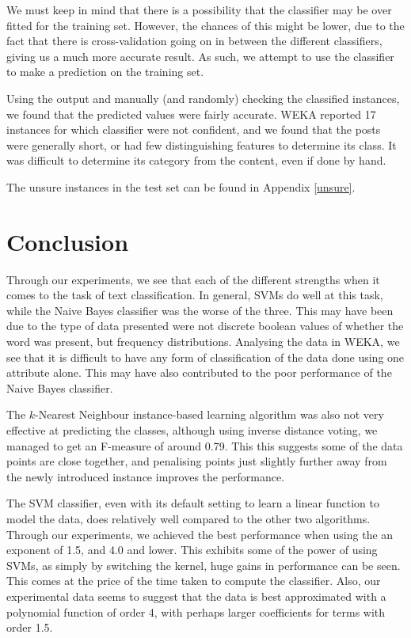 \documentclass[12pt]{article}
\begin{document}
We must keep in mind that there is a possibility that the classifier may be over fitted for the training set. However, the chances of this might be lower, due to the fact that there is cross-validation going on in between the different classifiers, giving us a much more accurate result. As such, we attempt to use the classifier to make a prediction on the training set. 

Using the output and manually (and randomly) checking the classified instances, we found that the predicted values were fairly accurate. WEKA reported 17 instances for which classifier were not confident, and we found that the posts were generally short, or had few distinguishing features to determine its class. It was difficult to determine its category from the content, even if done by hand. 

The unsure instances in the test set can be found in Appendix \ref{unsure}.

\section{Conclusion}
Through our experiments, we see that each of the different strengths when it comes to the task of text classification. In general, SVMs do well at this task, while the Naive Bayes classifier was the worse of the three. This may have been due to the type of data presented were not discrete boolean values of whether the word was present, but frequency distributions. Analysing the data in WEKA, we see that it is difficult to have any form of classification of the data done using one attribute alone. This may have also contributed to the poor performance of the Naive Bayes classifier.

The $k$-Nearest Neighbour instance-based learning algorithm was also not very effective at predicting the classes, although using inverse distance voting, we managed to get an F-measure of around 0.79. This this suggests some of the data points are close together, and penalising points just slightly further away from the newly introduced instance improves the performance.

The SVM classifier, even with its default setting to learn a linear function to model the data, does relatively well compared to the other two algorithms. Through our experiments, we achieved the best performance when using the an exponent of 1.5, and 4.0 and lower. This exhibits some of the power of using SVMs, as simply by switching the kernel, huge gains in performance can be seen. This comes at the price of the time taken to compute the classifier. Also, our experimental data seems to suggest that the data is best approximated with a polynomial function of order 4, with perhaps larger coefficients for terms with order 1.5.
\end{document}
